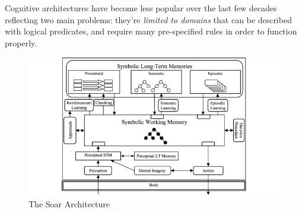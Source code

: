 Cognitive architectures have become less popular over the last few decades
reflecting two main problems: they're \emph{limited to domains} that can be
described with logical predicates, and require many pre-specified rules in order
to function properly.

\begin{figure}
    \centering
    \includegraphics[width=\textwidth]{img/The-Soar-cognitive-architecture.png}
    \caption{The Soar Architecture}
    \label{fig:soar}
\end{figure}
